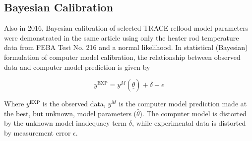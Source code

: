 \documentclass[11pt,titlepage]{article}
\begin{document}
\subsection{Bayesian Calibration}

Also in 2016, Bayesian calibration of selected TRACE reflood model parameters
were demonstrated in the same article \cite{Wicaksono2016} using only the heater 
rod temperature data from FEBA Test No. 216 and a normal likelihood. 
In statistical (Bayesian) formulation of computer model calibration, 
the relationship between observed data and computer model prediction is 
given by

\begin{equation}
	y^{\text{EXP}} = y^M (\underline{\hat{\theta}})+ \delta + \epsilon
\end{equation}

Where $y^\text{EXP}$ is the observed data, $y^M$  is the computer model 
prediction made at the best, but unknown, model parameters 
($\underline{\hat{\theta}}$). The computer model is distorted by the 
unknown model inadequacy term $\delta$, while experimental data is 
distorted by measurement error $\epsilon$.
\end{document}
